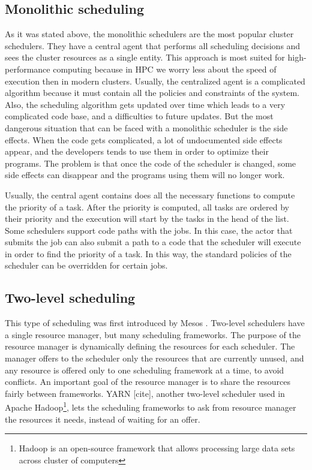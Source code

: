 \documentclass[11pt]{article}
\begin{document}
	\subsection{Monolithic scheduling}
    
    	As it was stated above, the monolithic schedulers are the most popular cluster schedulers. They have a central agent that performs all scheduling decisions and sees the cluster resources as a single entity. This approach is most suited for high-performance computing because in HPC we worry less about the speed of execution then in modern clusters. Usually, the centralized agent is a complicated algorithm because it must contain all the policies and constraints of the system. Also, the scheduling algorithm gets updated over time which leads to a very complicated code base, and a difficulties to future updates. But the most dangerous situation that can be faced with a monolithic scheduler is the side effects. When the code gets complicated, a lot of undocumented side effects appear, and the developers tends to use them in order to optimize their programs. The problem is that once the code of the scheduler is changed, some side effects can disappear and the programs using them will no longer work.
        
        Usually, the central agent contains does all the necessary functions to compute the priority of a task. After the priority is computed, all tasks are ordered by their priority and the execution will start by the tasks in the head of the list. Some schedulers support code paths with the jobs. In this case, the actor that submits the job can also submit a path to a code that the scheduler will execute in order to find the priority of a task. In this way, the standard policies of the scheduler can be overridden for certain jobs.
        
       
	\subsection{Two-level scheduling}
    
    	This type of scheduling was first introduced by Mesos \cite{mesos}. Two-level schedulers have a single resource manager, but many scheduling frameworks. The purpose of the resource manager is dynamically defining the resources for each scheduler. The manager offers to the scheduler only the resources that are currently unused, and any resource is offered only to one scheduling framework at a time, to avoid conflicts. An important goal of the resource manager is to share the resources fairly between frameworks. YARN [cite], another two-level scheduler used in Apache Hadoop\footnote{Hadoop is an open-source framework that allows processing large data sets across cluster of computers}, lets the scheduling frameworks to ask from resource manager the resources it needs, instead of waiting for an offer.
        
\end{document}
